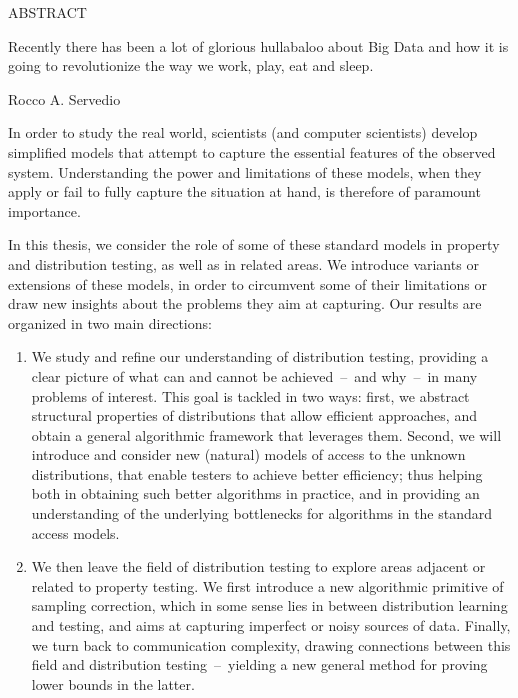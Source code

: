 
\pagestyle{empty} %
\begin{center}
  ABSTRACT

  \@title

  \@author
\end{center}

\epigraph{Recently there has been a lot of glorious hullabaloo about Big Data and how it is going to revolutionize the way we work, play, eat and sleep.}{Rocco A. Servedio}

In order to study the real world, scientists (and computer scientists) develop
simplified models that attempt to capture the essential features of the observed system.
Understanding the power and limitations of these models, when they apply or fail to fully
capture the situation at hand, is therefore of paramount importance.

In this thesis, we consider the role of some of these standard models in property and
distribution testing, as well as in related areas. We introduce variants or extensions of these
models, in order to circumvent some of their limitations or draw new insights about the
problems they aim at capturing. Our results are organized in two main directions:

\begin{enumerate}
  \item We study and refine our understanding of distribution testing, providing a clear picture of what can and cannot be achieved~--~and why~--~in many problems of interest. This goal is tackled in two ways: first, we abstract structural properties of distributions that allow efficient approaches, and obtain a general algorithmic framework that leverages them. Second, we will introduce and consider new (natural) models of access to the unknown distributions, that enable testers to achieve better efficiency; thus helping both in obtaining such better algorithms in practice, and in providing an understanding of the underlying bottlenecks for algorithms in the standard access models.

  \item We then leave the field of distribution testing to explore areas adjacent or related to property testing. We first introduce a new algorithmic primitive of sampling correction, which in some sense lies in between distribution learning and testing, and aims at capturing imperfect or noisy sources of data.  Finally, we turn back to communication complexity, drawing connections between this field and distribution testing~--~yielding a new general method for proving lower bounds in the latter.
\end{enumerate}

